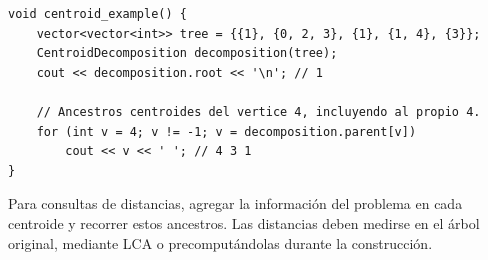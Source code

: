 \begin{lstlisting}[style=cpp]
void centroid_example() {
    vector<vector<int>> tree = {{1}, {0, 2, 3}, {1}, {1, 4}, {3}};
    CentroidDecomposition decomposition(tree);
    cout << decomposition.root << '\n'; // 1

    // Ancestros centroides del vertice 4, incluyendo al propio 4.
    for (int v = 4; v != -1; v = decomposition.parent[v])
        cout << v << ' '; // 4 3 1
}
\end{lstlisting}

Para consultas de distancias, agregar la informaci\'on del problema en cada
centroide y recorrer estos ancestros. Las distancias deben medirse en el
\'arbol original, mediante LCA o precomput\'andolas durante la construcci\'on.

